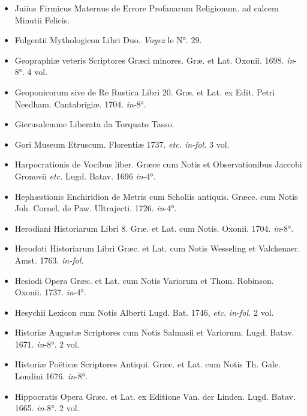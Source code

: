 \documentclass[a4paper, 18pt, oneside]{article}
\begin{document}
\begin{itemize}
    \item Juiius Firmicus Maternus de Errore Profanarum Religionum. ad calcem Minutii Felicis.

    \item Fulgentii Mythologicon Libri Duo. \emph{Voyez} le N°. 29.

    \item Geopraphiæ veteris Scriptores Græci minores. Græ. et Lat. Oxonii. 1698. \emph{in}-8°. 4 vol.

    \item Geoponicorum sive de Re Rustica Libri 20. Græ. et Lat. ex Edit. Petri Needham. Cantabrigiæ. 1704. \emph{in}-8°.

    \item Gierusalemme Liberata da Torquato Tasso.

    \item Gori Museum Etruscum. Florentiæ 1737. \emph{etc. in-fol.} 3 vol.

    \item Harpocrationis de Vocibus liber. Græce cum Notis et Observationibus Jaccobi Gronovii \emph{etc.} Lugd. Batav. 1696 \emph{in}-4°.

    \item Hephæstionis Enchiridion de Metris cum Scholiis antiquis. Græce. cum Notis Joh. Cornel. de Paw. Ultrajecti. 1726. \emph{in}-4°.

    \item Herodiani Historiarum Libri 8. Græ. et Lat. cum Notis. Oxonii. 1704. \emph{in}-8°.

    \item Herodoti Historiarum Libri Græc. et Lat. cum Notis Wesseling et Valckenaer. Amst. 1763. \emph{in-fol.}

    \item Hesiodi Opera Græc. et Lat. cum Notis Variorum et Thom. Robinson. Oxonii. 1737. \emph{in}-4°.

    \item Hesychii Lexicon cum Notis Alberti Lugd. Bat. 1746, \emph{etc.} \emph{in-fol.} 2 vol.

    \item Historiæ Augustæ Scriptores cum Notis Salmasii et Variorum. Lugd. Batav. 1671. \emph{in}-8°. 2 vol.

    \item Historiæ Poëticæ Scriptores Antiqui. Græc. et Lat. cum Notis Th. Gale. Londini 1676. \emph{in}-8°.

    \item Hippocratis Opera Græc. et Lat. ex Editione Van. der Linden. Lugd. Batav. 1665. \emph{in}-8°. 2 vol.


\end{itemize}
\end{document}
